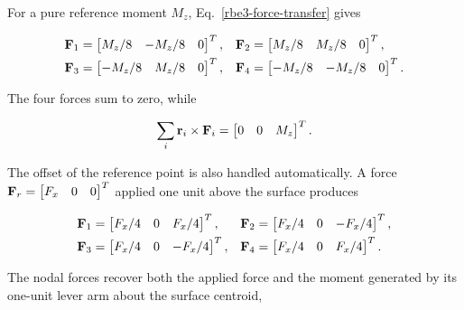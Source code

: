 For a pure reference moment $M_z$, Eq.~\eqref{rbe3-force-transfer} gives

\begin{equation}\label{rbe3-example-mz-distribution}
\begin{aligned}
 \mathbf{F}_1&=\begin{bmatrix} M_z/8&-M_z/8&0\end{bmatrix}^{T}, &
 \mathbf{F}_2&=\begin{bmatrix} M_z/8& M_z/8&0\end{bmatrix}^{T},\\
 \mathbf{F}_3&=\begin{bmatrix}-M_z/8& M_z/8&0\end{bmatrix}^{T}, &
 \mathbf{F}_4&=\begin{bmatrix}-M_z/8&-M_z/8&0\end{bmatrix}^{T}.
\end{aligned}
\end{equation}

The four forces sum to zero, while

\begin{equation}
    \sum_i \mathbf{r}_i\times\mathbf{F}_i
    =\begin{bmatrix}0&0&M_z\end{bmatrix}^{T}.
\end{equation}

The offset of the reference point is also handled automatically. A force
$\mathbf{F}_r=\begin{bmatrix}F_x&0&0\end{bmatrix}^{T}$ applied one unit above the
surface produces

\begin{equation}
\begin{aligned}
 \mathbf{F}_1&=\begin{bmatrix}F_x/4&0& F_x/4\end{bmatrix}^{T}, &
 \mathbf{F}_2&=\begin{bmatrix}F_x/4&0&-F_x/4\end{bmatrix}^{T},\\
 \mathbf{F}_3&=\begin{bmatrix}F_x/4&0&-F_x/4\end{bmatrix}^{T}, &
 \mathbf{F}_4&=\begin{bmatrix}F_x/4&0& F_x/4\end{bmatrix}^{T}.
\end{aligned}
\end{equation}

The nodal forces recover both the applied force and the moment generated by its
one-unit lever arm about the surface centroid,

